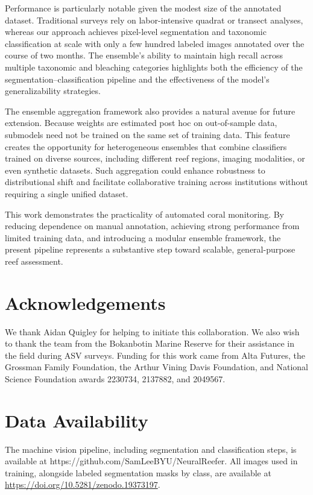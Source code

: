 \documentclass[11pt]{elsarticle}
\begin{document}
Performance is particularly notable given the modest size of the annotated dataset. Traditional surveys rely on labor-intensive quadrat or transect analyses, whereas our approach achieves pixel-level segmentation and taxonomic classification at scale with only a few hundred labeled images annotated over the course of two months. The ensemble's ability to maintain high recall across multiple taxonomic and bleaching categories highlights both the efficiency of the segmentation--classification pipeline and the effectiveness of the model's generalizability strategies.

The ensemble aggregation framework also provides a natural avenue for future extension. Because weights are estimated post hoc on out-of-sample data, submodels need not be trained on the same set of training data. This feature creates the opportunity for heterogeneous ensembles that combine classifiers trained on diverse sources, including different reef regions, imaging modalities, or even synthetic datasets. Such aggregation could enhance robustness to distributional shift and facilitate collaborative training across institutions without requiring a single unified dataset.

This work demonstrates the practicality of automated coral monitoring. By reducing dependence on manual annotation, achieving strong performance from limited training data, and introducing a modular ensemble framework, the present pipeline represents a substantive step toward scalable, general-purpose reef assessment.

\section*{Acknowledgements}

We thank Aidan Quigley for helping to initiate this collaboration. We also wish to thank the team from the Bokanbotin Marine Reserve for their assistance in the field during ASV surveys. Funding for this work came from Alta Futures, the Grossman Family Foundation, the Arthur Vining Davis Foundation, and National Science Foundation awards 2230734, 2137882, and 2049567.

\section*{Data Availability}
The machine vision pipeline, including segmentation and classification steps, is available at https://github.com/SamLeeBYU/NeuralReefer. All images used in training, alongside labeled segmentation masks by class, are available at \url{https://doi.org/10.5281/zenodo.19373197}.
\end{document}
